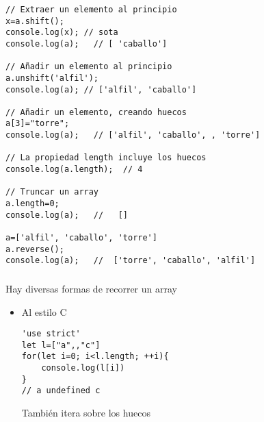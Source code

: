 \documentclass[ucs]{beamer}
\begin{document}
\begin{frame}[fragile]
\frametitle{}

  \begin{scriptsize}
  \begin{verbatim}
// Extraer un elemento al principio
x=a.shift();
console.log(x); // sota
console.log(a);   // [ 'caballo']

// Añadir un elemento al principio
a.unshift('alfil');
console.log(a); // ['alfil', 'caballo']

// Añadir un elemento, creando huecos
a[3]="torre";
console.log(a);   // ['alfil', 'caballo', , 'torre']

// La propiedad length incluye los huecos
console.log(a.length);  // 4

// Truncar un array
a.length=0;
console.log(a);   //   []

a=['alfil', 'caballo', 'torre']
a.reverse();
console.log(a);   //  ['torre', 'caballo', 'alfil']
  \end{verbatim}
  \end{scriptsize}

\end{frame}


\begin{frame}[fragile]
\frametitle{}
Hay diversas formas de recorrer un array
\begin{itemize}
\item
Al estilo C
  \begin{scriptsize}
  \begin{verbatim}
'use strict'
let l=["a",,"c"]
for(let i=0; i<l.length; ++i){
    console.log(l[i])
}
// a undefined c
  \end{verbatim}
  \end{scriptsize}


También itera sobre los huecos

\end{itemize}

\end{frame}
\end{document}
